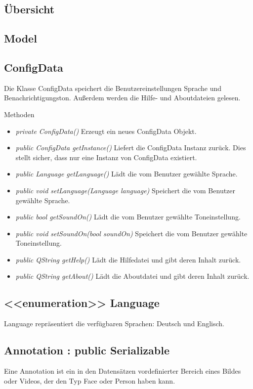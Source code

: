 \subsection{Übersicht}

\subsection{Model}

\subsection*{ConfigData}
Die Klasse ConfigData speichert die Benutzereinstellungen Sprache und Benachrichtigungston. Außerdem werden die Hilfe- und Aboutdateien gelesen.

Methoden
\begin{itemize}
\item \textit{private ConfigData()} Erzeugt ein neues ConfigData Objekt.
\item \textit{public ConfigData getInstance()} Liefert die ConfigData Instanz zurück. Dies stellt sicher, dass nur eine Instanz von ConfigData existiert.
\item \textit{public Language getLanguage()} Lädt die vom Benutzer gewählte Sprache.
\item \textit{public void setLanguage(Language language)} Speichert die vom Benutzer gewählte Sprache.
\item \textit{public bool getSoundOn()} Lädt die vom Benutzer gewählte Toneinstellung.
\item \textit{public void setSoundOn(bool soundOn)} Speichert die vom Benutzer gewählte Toneinstellung.
\item \textit{public QString getHelp()} Lädt die Hilfedatei und gibt deren Inhalt zurück.
\item \textit{public QString getAbout()} Lädt die Aboutdatei und gibt deren Inhalt zurück.
\end{itemize}

\subsection*{<<enumeration>> Language}
Language repräsentiert die verfügbaren Sprachen: Deutsch und Englisch.

\subsection*{Annotation : public Serializable}
Eine Annotation ist ein in den Datensätzen vordefinierter Bereich eines Bildes oder Videos, der den Typ Face oder Person haben kann.

